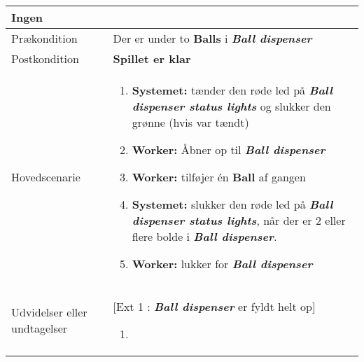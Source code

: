 \documentclass[Kravspecifikation/Kravspec_Main.tex]{subfiles}
\begin{document}
\begin{longtable}[]{@{}ll@{}}
\begin{minipage}[t]{0.47\columnwidth}
{Ingen}\strut
\end{minipage}\tabularnewline
\toprule
\begin{minipage}[t]{0.47\columnwidth}\raggedright
{Prækondition}\strut
\end{minipage} & \begin{minipage}[t]{0.47\columnwidth}\raggedright
{Der er under to \textbf{Balls} i \textit{\textbf{Ball dispenser}}}\strut
\end{minipage}\tabularnewline
\toprule
\begin{minipage}[t]{0.47\columnwidth}\raggedright
{Postkondition}\strut
\end{minipage} & \begin{minipage}[t]{0.47\columnwidth}\raggedright
{\textbf{Spillet er klar}}\strut
\end{minipage}\tabularnewline
\toprule
\begin{minipage}[t]{0.47\columnwidth}\raggedright
{Hovedscenarie}\strut
\end{minipage} & \begin{minipage}[t]{0.47\columnwidth}\raggedright
\begin{enumerate}
\tightlist
\item
  {\textbf{Systemet:} tænder den røde led på \textbf{\textit{Ball dispenser status lights}} og slukker den grønne (hvis var tændt)}
\item
  {\textbf{Worker:} Åbner op til \textit{\textbf{Ball dispenser}}}
\item
  {\textbf{Worker:} tilføjer én \textbf{Ball} af gangen}
\item \textbf{Systemet:} slukker den røde led på \textbf{\textit{Ball dispenser status lights}}, når der er 2 eller flere bolde i \textit{\textbf{Ball dispenser}}. 
\item 
  {\textbf{Worker:} lukker for \textit{\textbf{Ball dispenser}} }
\end{enumerate}\strut
\end{minipage}\tabularnewline
\toprule
\begin{minipage}[t]{0.47\columnwidth}\raggedright
{Udvidelser eller undtagelser}\strut
\end{minipage} & \begin{minipage}[t]{0.47\columnwidth}\raggedright
{[Ext 1 : \textit{\textbf{Ball dispenser}} er fyldt helt op]
\begin{enumerate}
\tightlist
\item

\end{enumerate}}
\end{minipage}
\end{longtable}
\end{document}
